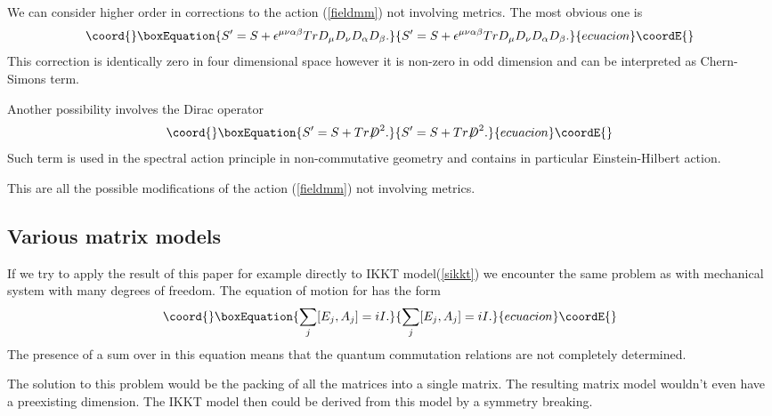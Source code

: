 \documentclass[a4paper,11pt]{article}
\begin{document}
We can consider higher order in \coordHE{} corrections to the action
(\ref{fieldmm}) not involving metrics. The most obvious one is
\begin{equation}\coord{}\boxEquation{
S'=S+\epsilon^{\mu \nu \alpha \beta} Tr D_\mu D_\nu D_\alpha
D_\beta. \label{cst}
}{
S'=S+\epsilon^{\mu \nu \alpha \beta} Tr D_\mu D_\nu D_\alpha
D_\beta. }{ecuacion}\coordE{}\end{equation}
This correction is identically zero in four dimensional space
however it is non-zero in odd dimension and can be interpreted as
Chern-Simons term.

Another possibility involves the Dirac operator
\begin{equation}\coord{}\boxEquation{
S'=S+Tr\mathord{\not\mathrel{D}}^2. \label{sp}
}{
S'=S+Tr\mathord{\not\mathrel{D}}^2. }{ecuacion}\coordE{}\end{equation}
Such term is used in the spectral action principle in
non-commutative geometry \cite{spacpr,connes} and contains in
particular Einstein-Hilbert action.

This are all the possible modifications of the action
(\ref{fieldmm}) not involving metrics.

\subsection*{Various matrix models}
If we try to apply the result of this paper for example directly
to IKKT model(\ref{sikkt}) we encounter the same problem as with
mechanical system with many degrees of freedom. The equation of
motion for \coordHE{} has the form
\begin{equation}\coord{}\boxEquation{
\sum\limits_j [E_j,A_j] = iI. \label{we2}
}{
\sum\limits_j [E_j,A_j] = iI. }{ecuacion}\coordE{}\end{equation}
The presence of a sum over \coordHE{} in this equation means that the
quantum commutation relations are not completely determined.

The solution to this problem would be the packing of all the
matrices \coordHE{} into a single matrix. The resulting matrix model
wouldn't even have a preexisting dimension. The IKKT model then
could be derived from this model by a symmetry breaking.
\end{document}
